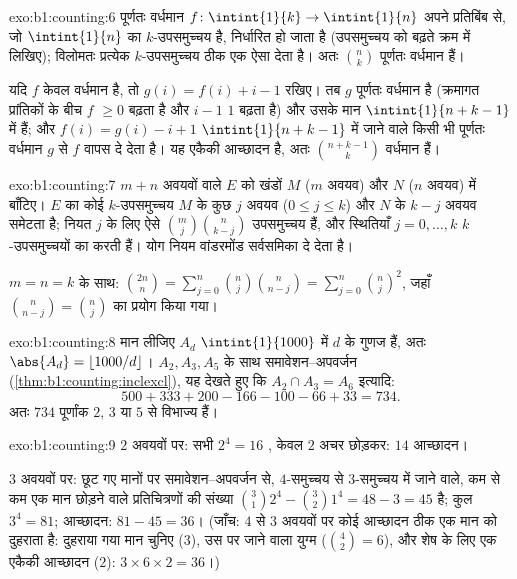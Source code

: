 \begin{solution}{exo:b1:counting:6}
पूर्णतः वर्धमान  $f \colon \intint{1}{k} \to \intint{1}{n}$ अपने
प्रतिबिंब से, जो $\intint{1}{n}$ का $k$-उपसमुच्चय है, निर्धारित हो जाता है
(उपसमुच्चय को बढ़ते क्रम में लिखिए); विलोमतः प्रत्येक $k$-उपसमुच्चय ठीक एक
ऐसा  देता है। अतः $\binom nk$ पूर्णतः वर्धमान  हैं।

यदि $f$ केवल वर्धमान है, तो $g(i) = f(i) + i - 1$ रखिए। तब $g$ पूर्णतः
वर्धमान है (क्रमागत प्रांतिकों के बीच $f$ $\geq 0$ बढ़ता है और $i - 1$ $1$
बढ़ता है) और उसके मान $\intint{1}{n + k - 1}$ में हैं; और $f(i) = g(i) - i +
1$ $\intint{1}{n+k-1}$ में जाने वाले किसी भी पूर्णतः वर्धमान $g$ से $f$ वापस
दे देता है। यह एकैकी आच्छादन है, अतः $\binom{n + k - 1}{k}$ वर्धमान
 हैं।
\end{solution}

\begin{solution}{exo:b1:counting:7}
$m + n$ अवयवों वाले  $E$ को खंडों $M$ ($m$ अवयव) और $N$ ($n$ अवयव)
में बाँटिए। $E$ का कोई $k$-उपसमुच्चय $M$ के कुछ $j$ अवयव ($0 \leq j \leq k$)
और $N$ के $k - j$ अवयव समेटता है; नियत $j$ के लिए ऐसे $\binom mj
\binom{n}{k-j}$ उपसमुच्चय हैं, और स्थितियाँ $j = 0, \dots, k$
$k$-उपसमुच्चयों का  करती हैं। योग नियम वांडरमोंड
सर्वसमिका दे देता है।

$m = n = k$ के साथ: $\binom{2n}{n} = \sum_{j=0}^{n} \binom nj \binom{n}{n-j}
= \sum_{j=0}^{n} \binom nj^2$, जहाँ $\binom{n}{n-j} = \binom nj$ का प्रयोग
किया गया।
\end{solution}

\begin{solution}{exo:b1:counting:8}
मान लीजिए $A_d$ $\intint{1}{1000}$ में $d$ के गुणज हैं, अतः $\abs{A_d} =
\lfloor 1000/d \rfloor$। $A_2, A_3, A_5$ के साथ समावेशन--अपवर्जन
(\cref{thm:b1:counting:inclexcl}), यह देखते हुए कि $A_2 \cap A_3 = A_6$
इत्यादि:
\[
500 + 333 + 200 - 166 - 100 - 66 + 33 = 734 .
\]
अतः $734$ पूर्णांक $2$, $3$ या $5$ से विभाज्य हैं।
\end{solution}

\begin{solution}{exo:b1:counting:9}
$2$ अवयवों पर: सभी $2^4 = 16$ , केवल $2$ अचर  छोड़कर:
$14$ आच्छादन।

$3$ अवयवों पर: छूट गए मानों पर समावेशन--अपवर्जन से, $4$-समुच्चय से
$3$-समुच्चय में जाने वाले, कम से कम एक मान छोड़ने वाले प्रतिचित्रणों की
संख्या $\binom 31 2^4 - \binom 32 1^4 = 48 - 3 = 45$ है; कुल 
$3^4 = 81$; आच्छादन: $81 - 45 = 36$। (जाँच: $4$ से $3$ अवयवों पर कोई आच्छादन
ठीक एक मान को दुहराता है: दुहराया गया मान चुनिए ($3$), उस पर जाने वाला युग्म
($\binom 42 = 6$), और शेष के लिए एक एकैकी आच्छादन ($2$): $3 \times 6 \times
2 = 36$।)
\end{solution}

